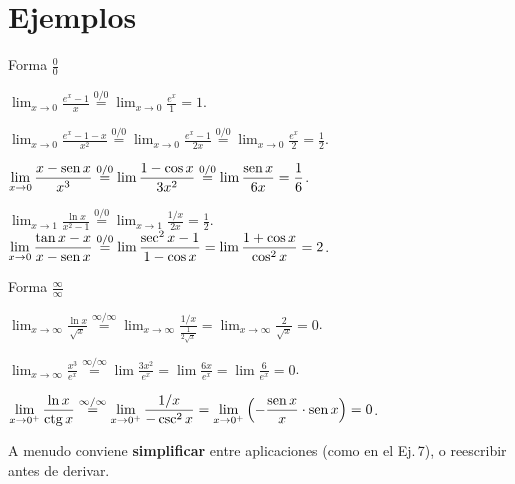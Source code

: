 \documentclass[10pt,aspectratio=169]{beamer}
\begin{document}
\section{Ejemplos}

\begin{frame}{Forma $\frac00$}
  \begin{ejemplo}[1]
    $\displaystyle\lim_{x\to0}\frac{e^x-1}{x}\overset{0/0}{=}\lim_{x\to0}\frac{e^x}{1}=1$.
  \end{ejemplo}
  \begin{ejemplo}
    $\displaystyle\lim_{x\to0}\frac{e^x-1-x}{x^2}\overset{0/0}{=}\lim_{x\to0}\frac{e^x-1}{2x}\overset{0/0}{=}\lim_{x\to0}\frac{e^x}{2}=\frac12$.
  \end{ejemplo}
  \begin{ejemplo}[3]
    $\displaystyle\lim_{x\to0}\frac{x-\operatorname{sen} x}{x^3}\overset{0/0}{=}\lim\frac{1-\cos x}{3x^2}\overset{0/0}{=}\lim\frac{\operatorname{sen} x}{6x}=\frac16$.
  \end{ejemplo}
  \begin{ejemplo}[4]
    $\displaystyle\lim_{x\to1}\frac{\ln x}{x^2-1}\overset{0/0}{=}\lim_{x\to1}\frac{1/x}{2x}=\frac12$. \qquad
    $\displaystyle\lim_{x\to0}\frac{\tan x-x}{x-\operatorname{sen} x}\overset{0/0}{=}\lim\frac{\sec^2x-1}{1-\cos x}=\lim\frac{1+\cos x}{\cos^2x}=2$.
  \end{ejemplo}
\end{frame}

\begin{frame}{Forma $\frac\infty\infty$}
  \begin{ejemplo}[5]
    $\displaystyle\lim_{x\to\infty}\frac{\ln x}{\sqrt x}\overset{\infty/\infty}{=}\lim_{x\to\infty}\frac{1/x}{\frac{1}{2\sqrt x}}=\lim_{x\to\infty}\frac{2}{\sqrt x}=0$.
  \end{ejemplo}
  \begin{ejemplo}[6]
    $\displaystyle\lim_{x\to\infty}\frac{x^3}{e^x}\overset{\infty/\infty}{=}\lim\frac{3x^2}{e^x}=\lim\frac{6x}{e^x}=\lim\frac{6}{e^x}=0$.
  \end{ejemplo}
  \begin{ejemplo}[7]
    $\displaystyle\lim_{x\to0^+}\frac{\ln x}{\operatorname{ctg} x}\overset{\infty/\infty}{=}\lim_{x\to0^+}\frac{1/x}{-\csc^2x}=\lim_{x\to0^+}\left(-\frac{\operatorname{sen} x}{x}\cdot\operatorname{sen} x\right)=0$.
  \end{ejemplo}
  \begin{observacion}
    A menudo conviene \textbf{simplificar} entre aplicaciones (como en el Ej.\,7), o reescribir antes de derivar.
  \end{observacion}
\end{frame}
\end{document}
